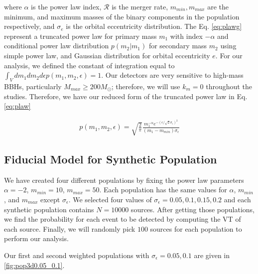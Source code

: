 \documentclass[twocolumn,prd,nofootinbib]{revtex4}
\begin{document}
where $\alpha$ is the power law index, $\mathcal{R}$ is the merger rate, $m_{min}, m_{max}$ are the minimum, and maximum masses of the binary components in the population respectively, and $\sigma_e$ is the orbital eccentricity distribution. The Eq. \ref{eq:plawg} represent a truncated power law for primary mass $m_1$ with index $-\alpha$ and conditional power law distribution $p(m_2|m_1)$ for secondary mass $m_2$ using simple power law, and Gaussian distribution for orbital eccentricity $e$. 
For our analysis, we defined the constant of integration equal to $\int_V dm_1 dm_2 d\epsilon p(m_1,m_2,\epsilon) = 1$.  Our detectors are very sensitive to high-mass BBHs, particularly $M_{max}\geq 200 M_\odot$; therefore, we will use $k_m=0$ throughout the studies. Therefore, we have our reduced form of the truncated power law in Eq. \ref{eq:plaw}

\begin{align}
\label{eq:plaw}
p(m_1,m_2,\epsilon) = \sqrt{\frac{2}{\pi}} \frac{ m_1^{-\alpha}  e^{-(\epsilon/\sqrt{2}\sigma_\epsilon)^2}}{(m_1-m_{min})\sigma_\epsilon}
\end{align}


\subsection{Fiducial Model for Synthetic Population}

We have created four different populations by fixing the
power law parameters $\alpha = -2$, $m_{min} = 10$, $m_{max}=50$. Each population has the same values for $\alpha$, $m_{min}$, and $m_{max}$ except $\sigma_\epsilon$. We selected four values of $\sigma_\epsilon = 0.05,0.1,0.15,0.2$ and each synthetic population contains $N=10000$ sources. After getting those populations, we find the probability for each event to be detected by computing the VT of each source. Finally, we will randomly pick $100$ sources for each population to perform our analysis.

Our first and second weighted populations with $\sigma_\epsilon=0.05, 0.1$ are given in \ref{fig:pop3d0.05_0.1}.
\end{document}
